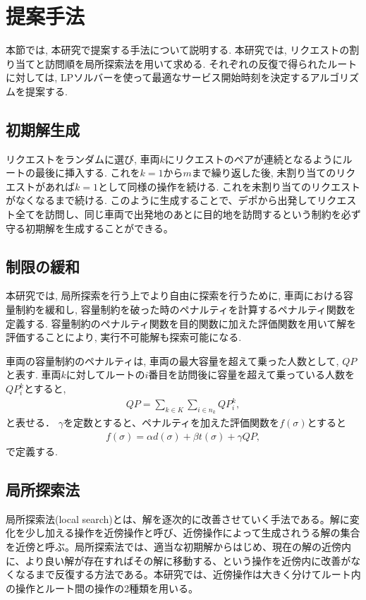 \chapter{提案手法}\label{method}
本節では, 本研究で提案する手法について説明する. 本研究では, リクエストの割り当てと訪問順を局所探索法を用いて求める. それぞれの反復で得られたルートに対しては, LPソルバーを使って最適なサービス開始時刻を決定するアルゴリズムを提案する.
\section{初期解生成}
リクエストをランダムに選び, 車両$k$にリクエストのペアが連続となるようにルートの最後に挿入する. これを$k = 1 から m$まで繰り返した後, 未割り当てのリクエストがあれば$k = 1 $として同様の操作を続ける. これを未割り当てのリクエストがなくなるまで続ける.
このように生成することで、デポから出発してリクエスト全てを訪問し、同じ車両で出発地のあとに目的地を訪問するという制約を必ず守る初期解を生成することができる。

\section{制限の緩和}
本研究では, 局所探索を行う上でより自由に探索を行うために, 車両における容量制約を緩和し, 容量制約を破った時のペナルティを計算するペナルティ関数を定義する. 容量制約のペナルティ関数を目的関数に加えた評価関数を用いて解を評価することにより, 実行不可能解も探索可能になる.

車両の容量制約のペナルティは, 車両の最大容量を超えて乗った人数として, $QP$と表す. 車両$k$に対してルートの$i$番目を訪問後に容量を超えて乗っている人数を$QP_i^k$とすると,
\begin{align*}
  QP = \sum_{k \in K}\sum_{i \in n_k} QP_i^k,
\end{align*}
と表せる．
$\gamma$を定数とすると、ペナルティを加えた評価関数を$f(\sigma)$とすると
\begin{align*}
  f(\sigma) = \alpha d(\sigma)+ \beta t(\sigma) + \gamma QP,
\end{align*}
で定義する.

\section{局所探索法}
局所探索法(local search)とは、解を逐次的に改善させていく手法である。解に変化を少し加える操作を近傍操作と呼び、近傍操作によって生成されうる解の集合を近傍と呼ぶ。局所探索法では、適当な初期解からはじめ、現在の解の近傍内に、より良い解が存在すればその解に移動する、という操作を近傍内に改善がなくなるまで反復する方法である。本研究では、近傍操作は大きく分けてルート内の操作とルート間の操作の2種類を用いる。

